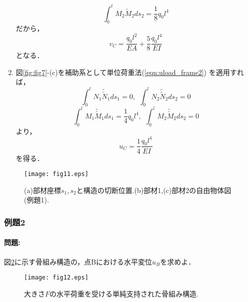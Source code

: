 \documentclass[10pt,a4j]{jarticle}
\begin{document}
\begin{enumerate}
\begin{equation}
		\int_0^l M_2\tilde M_2ds_2=\frac{1}{8}q_0l^4
		\label{eqn:}
	\end{equation}
	だから，
	\begin{equation}
		v_C=
		\frac{q_0l^2}{EA}+ \frac{5}{8}\frac{q_0l^4}{EI}
		\label{eqn:}
	\end{equation}
	となる．
\item
	図\ref{fig:fig7}-(c)を補助系として単位荷重法(\ref{eqn:uload_frame2})
	を適用すれば，
	\begin{equation}
		\int_0^l N_1\tilde{\tilde N}_1ds_1=0, \ \ 
		\int_0^l N_2\tilde{\tilde N}_2ds_2=0
		\label{eqn:}
	\end{equation}
	\begin{equation}
		\int_0^l M_1\tilde{\tilde M}_1ds_1=\frac{1}{4}q_0l^4, \ \ 
		\int_0^l M_2\tilde{\tilde M}_2ds_2=0
		\label{eqn:}
	\end{equation}
	より，
	\begin{equation}
		u_C=
		\frac{1}{4}\frac{q_0l^4}{EI}
		\label{eqn:}
	\end{equation}
	を得る．
\end{enumerate}
\begin{figure}[h]
	\begin{center}
	\texttt{[image: fig11.eps]} 
	\end{center}
	\caption{(a)部材座標$s_1,s_2$と構造の切断位置.(b)部材1,(c)部材2の自由物体図(例題1).} 
	\label{fig:fig11}
\end{figure}
\subsubsection{例題2}
\paragraph{問題:}
図\ref{fig:fig12}に示す骨組み構造の，点Bにおける水平変位$u_B$を求めよ．
\begin{figure}[h]
	\begin{center}
	\texttt{[image: fig12.eps]} 
	\end{center}
	\caption{大きさ$F$の水平荷重を受ける単純支持された骨組み構造.} 
	\label{fig:fig12}
\end{figure}
\end{document}
